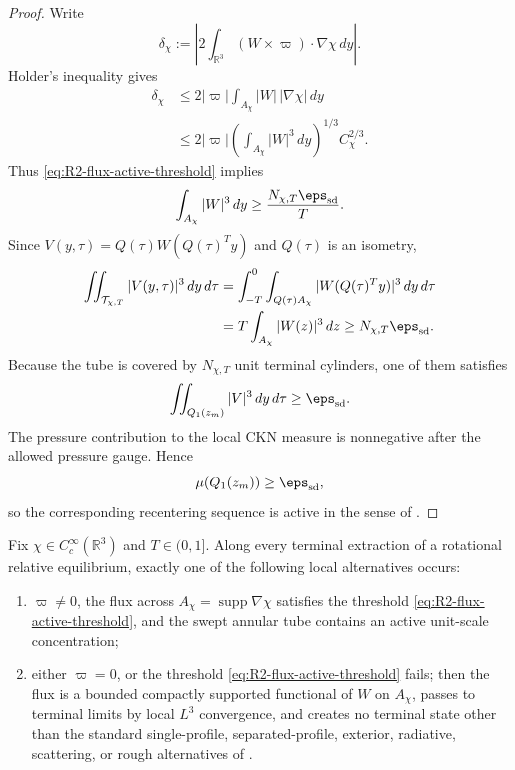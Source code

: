 \begin{proof}
Write
\[
   \delta_\chi:=
   \left|
      2\int_{\mathbb R^3}(W\times\varpi)\cdot\nabla\chi\,dy
   \right| .
\]
Holder's inequality gives
\[
\begin{aligned}
   \delta_\chi
   &\le
   2|\varpi|\int_{A_\chi}|W|\,|\nabla\chi|\,dy  \\
   &\le
   2|\varpi|
   \left(\int_{A_\chi}|W|^3\,dy\right)^{1/3}
   C_\chi^{2/3}.
\end{aligned}
\]
Thus \eqref{eq:R2-flux-active-threshold} implies
\[
   \int_{A_\chi}|W|^3\,dy\ge \frac{N_{\chi,T}\eps_{\rm sd}}{T}.
\]
Since \(V(y,\tau)=Q(\tau)W(Q(\tau)^Ty)\) and \(Q(\tau)\) is an isometry,
\[
\begin{aligned}
   \iint_{\mathcal T_{\chi,T}} |V(y,\tau)|^3\,dy\,d\tau
   &=
   \int_{-T}^{0}\int_{Q(\tau)A_\chi}
      |W(Q(\tau)^Ty)|^3\,dy\,d\tau \\
   &=
   T\int_{A_\chi}|W(z)|^3\,dz
   \ge N_{\chi,T}\eps_{\rm sd}.
\end{aligned}
\]
Because the tube is covered by \(N_{\chi,T}\) unit terminal cylinders, one of
them satisfies
\[
   \iint_{Q_1(z_m)} |V|^3\,dy\,d\tau\ge \eps_{\rm sd}.
\]
The pressure contribution to the local CKN measure is nonnegative after the
allowed pressure gauge.  Hence
\[
   \mu(Q_1(z_m))\ge \eps_{\rm sd},
\]
so the corresponding recentering sequence is active in the sense of
.
\end{proof}

\begin{lemma}
\label{lem:R2-flux-routing-dichotomy}
Fix \(\chi\in C_c^\infty(\mathbb R^3)\) and \(T\in(0,1]\).  Along every
terminal extraction of a rotational relative equilibrium, exactly one of the
following local alternatives occurs:
\begin{enumerate}[label=(\roman*)]
   \item \(\varpi\ne0\), the flux across
   \(A_\chi=\operatorname{supp}\nabla\chi\) satisfies the threshold
   \eqref{eq:R2-flux-active-threshold}, and the swept annular tube contains an
   active unit-scale concentration;
   \item either \(\varpi=0\), or the threshold
   \eqref{eq:R2-flux-active-threshold} fails; then the flux is a bounded
   compactly supported functional of \(W\) on \(A_\chi\), passes to terminal
   limits by local \(L^3\) convergence, and creates no terminal state other than
   the standard single-profile, separated-profile, exterior, radiative,
   scattering, or rough
   alternatives of .
\end{enumerate}
\end{lemma}

